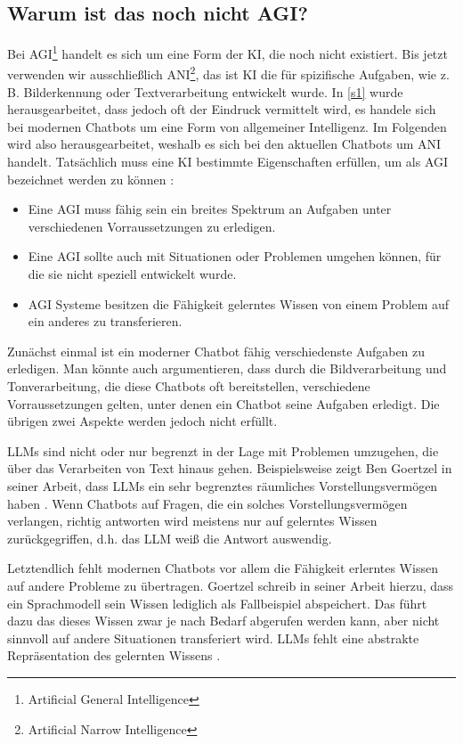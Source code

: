 	\subsection{Warum ist das noch nicht AGI?}\label{s2ss3}
	Bei AGI\footnote{Artificial General Intelligence} handelt es sich um eine Form der KI, die noch nicht existiert. 
	Bis jetzt verwenden wir ausschließlich ANI\footnote{Artificial Narrow Intelligence}, das ist KI die für 
	spizifische Aufgaben, wie z. B. Bilderkennung oder Textverarbeitung entwickelt wurde. In \ref{s1} wurde 
	herausgearbeitet, dass jedoch oft der Eindruck vermittelt wird, es handele sich bei modernen Chatbots um 
	eine Form von allgemeiner Intelligenz. Im Folgenden wird also herausgearbeitet, weshalb es sich bei den aktuellen Chatbots um ANI 
	handelt. Tatsächlich muss eine KI bestimmte Eigenschaften erfüllen, um als AGI bezeichnet werden zu können 
	\cite[S. 8]{goertzel23}:
	\begin{itemize}
	\item Eine AGI muss fähig sein ein breites Spektrum an Aufgaben unter verschiedenen Vorraussetzungen zu erledigen. 
	\item Eine AGI sollte auch mit Situationen oder Problemen umgehen können, für die sie nicht speziell entwickelt wurde. 
	\item AGI Systeme besitzen die Fähigkeit gelerntes Wissen von einem Problem auf ein anderes zu transferieren. 
	\end{itemize}	
	Zunächst einmal ist ein moderner Chatbot fähig verschiedenste Aufgaben zu erledigen. Man könnte auch argumentieren,
	dass durch die Bildverarbeitung und Tonverarbeitung, die diese Chatbots oft bereitstellen, verschiedene Vorraussetzungen 
	gelten, unter denen ein Chatbot seine Aufgaben erledigt. Die übrigen zwei Aspekte werden jedoch nicht erfüllt. 
	
	LLMs sind nicht oder nur begrenzt in der Lage mit Problemen umzugehen, die über das Verarbeiten von Text hinaus gehen. 
	Beispielsweise zeigt Ben Goertzel in seiner Arbeit, dass LLMs ein sehr begrenztes räumliches Vorstellungsvermögen haben 
	\cite[S. 32-35]{goertzel23}. Wenn Chatbots auf Fragen, die ein solches Vorstellungsvermögen verlangen, richtig antworten 
	wird meistens nur auf gelerntes Wissen zurückgegriffen, d.h. das LLM weiß die Antwort auswendig.
	
	Letztendlich fehlt modernen Chatbots vor allem die Fähigkeit erlerntes Wissen auf andere Probleme zu übertragen. Goertzel schreib in
	seiner Arbeit hierzu, dass ein Sprachmodell sein Wissen lediglich als Fallbeispiel abspeichert. Das führt dazu das dieses Wissen
	zwar je nach Bedarf abgerufen werden kann, aber nicht sinnvoll auf andere Situationen transferiert wird. LLMs fehlt eine 
	abstrakte Repräsentation des gelernten Wissens \cite[S. 81f]{goertzel23}. 
	
